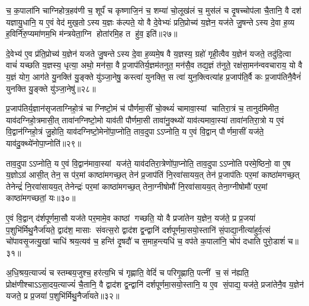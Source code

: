 च॒ क॒पाला॑नि चाग्निहोत्र॒हव॑णी च॒ शूर्पं॑ च कृष्णाजि॒नं च॒ शम्या॑ चो॒लूख॑लं च॒ मुस॑लं च दृ॒षच्चोप॑ला चै॒तानि॒ वै दश॑ यज्ञायु॒धानि॒ य ए॒वं वेद॑ मुख॒तोऽस्य य॒ज्ञः क॑ल्पते॒ यो वै दे॒वेभ्यः॑ प्रति॒प्रोच्य॑ य॒ज्ञेन॒ यज॑ते जु॒षन्तेऽस्य दे॒वा ह॒व्य ह॒विर्नि॑रु॒प्यमा॑णम॒भि म॑न्त्रयेता॒ग्नि होता॑रमि॒ह त हु॑व॒ इति॑॥२७॥

दे॒वेभ्य॑ ए॒व प्र॑ति॒प्रोच्य॑ य॒ज्ञेन॑ यजते जु॒षन्तेऽस्य दे॒वा ह॒व्यमे॒ष वै य॒ज्ञस्य॒ ग्रहो॑ गृही॒त्वैव य॒ज्ञेन॑ यजते॒ तदु॑दि॒त्वा वाचं॑ यच्छति य॒ज्ञस्य॒ धृत्या॒ अथो॒ मन॑सा॒ वै प्र॒जाप॑तिर्य॒ज्ञम॑तनुत॒ मन॑सै॒व तद्य॒ज्ञं त॑नुते॒ रक्ष॑सा॒मन॑न्ववचाराय॒ यो वै य॒ज्ञं योग॒ आग॑ते यु॒नक्ति॑ यु॒ङ्क्ते यु॑ञ्जा॒नेषु॒ कस्त्वा॑ युनक्ति॒ स त्वा॑ युन॒क्त्वित्या॑ह प्र॒जाप॑ति॒र्वै कः प्र॒जाप॑तिनै॒वैनं॑ युनक्ति यु॒ङ्क्ते यु॑ञ्जा॒नेषु॑॥२८॥

{\anuvakamend[{वै मनः॒ स्फ्य इति॑ युन॒क्त्वेका॑दश च॥८॥}]}

प्र॒जाप॑तिर्य॒ज्ञान॑सृजताग्निहो॒त्रं चाग्निष्टो॒मं च॑ पौर्णमा॒सीं चो॒क्थ्यं॑ चामावा॒स्यां चातिरा॒त्रं च॒ तानुद॑मिमीत॒ याव॑दग्निहो॒त्रमासी॒त् तावा॑नग्निष्टो॒मो याव॑ती पौर्णमा॒सी तावा॑नु॒क्थ्यो॑ याव॑त्यमावा॒स्या॑ तावा॑नतिरा॒त्रो य ए॒वं वि॒द्वान॑ग्निहो॒त्रं जु॒होति॒ याव॑दग्निष्टो॒मेनो॑पा॒प्नोति॒ ताव॒दुपाऽऽप्नोति॒ य ए॒वं वि॒द्वान् पौर्णमा॒सीं यज॑ते॒ याव॑दु॒क्थ्ये॑नोपा॒प्नोति॑॥२९॥

ताव॒दुपाऽऽप्नोति॒ य ए॒वं वि॒द्वान॑मावा॒स्यां यज॑ते॒ याव॑दतिरा॒त्रेणो॑पा॒प्नोति॒ ताव॒दुपाऽऽप्नोति परमे॒ष्ठिनो॒ वा ए॒ष य॒ज्ञोऽग्र॑ आसी॒त् तेन॒ स प॑र॒मां काष्ठा॑मगच्छ॒त् तेन॑ प्र॒जाप॑तिं नि॒रवा॑सायय॒त् तेन॑ प्र॒जाप॑तिः पर॒मां काष्ठा॑मगच्छ॒त् तेनेन्द्रं॑ नि॒रवा॑सायय॒त् तेनेन्द्रः॑ पर॒मां काष्ठा॑मगच्छ॒त् तेना॒ग्नीषोमौ॑ नि॒रवा॑सायय॒त् तेना॒ग्नीषोमौ॑ पर॒मां काष्ठा॑मगच्छतां॒ यः॥३०॥

ए॒वं वि॒द्वान् द॑र्\mbox{}शपूर्णमा॒सौ यज॑ते पर॒मामे॒व काष्ठां गच्छति॒ यो वै प्रजा॑तेन य॒ज्ञेन॒ यज॑ते॒ प्र प्र॒जया॑ प॒शुभि॑र्मिथु॒नैर्जा॑यते॒ द्वाद॑श॒ मासाः संवत्स॒रो द्वाद॑श द्व॒न्द्वानि॑ दर्\mbox{}शपूर्णमा॒सयो॒स्तानि॑ सं॒पाद्या॒नीत्या॑हुर्व॒त्सं चो॑पावसृ॒जत्यु॒खां चाधि॑ श्रय॒त्यव॑ च॒ हन्ति॑ दृ॒षदौ॑ च स॒माह॒न्त्यधि॑ च॒ वप॑ते क॒पाला॑नि॒ चोप॑ दधाति पुरो॒डाशं॑ च॥३१॥

अ॒धि॒श्रय॒त्याज्यं॑ च स्तम्बय॒जुश्च॒ हर॑त्य॒भि च॑ गृह्णाति॒ वेदिं॑ च परिगृ॒ह्णाति॒ पत्नीं च॒ सं न॑ह्यति॒ प्रोक्ष॑णीश्चाऽऽसा॒दय॒त्याज्यं॑ चै॒तानि॒ वै द्वाद॑श द्व॒न्द्वानि॑ दर्\mbox{}शपूर्णमा॒सयो॒स्तानि॒ य ए॒व सं॒पाद्य॒ यज॑ते॒ प्रजा॑तेनै॒व य॒ज्ञेन॑ यजते॒ प्र प्र॒जया॑ प॒शुभि॑र्मिथु॒नैर्जा॑यते॥३२॥

{\anuvakamend[{उ॒क्थ्ये॑नोपा॒प्नोत्य॑गच्छतां॒ यः पु॑रो॒डाशं॑ च चत्वारि॒ꣳ॒शच्च॑॥९॥}]}

